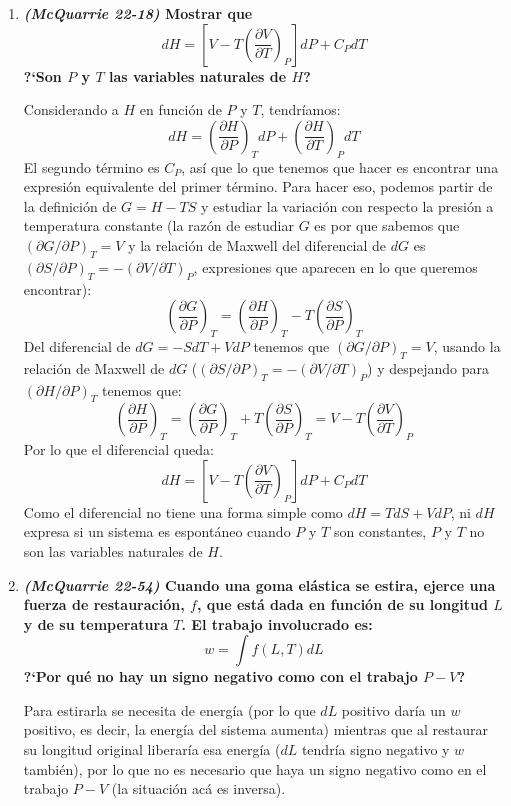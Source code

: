 \documentclass[a4paper,12pt]{article}
\begin{document}
\begin{enumerate}
\begin{enumerate}
Y:
$$q=-w=-(-0.63\;\mbox{kJ})=0.63\;\mbox{kJ}$$
Mientras que las funciones de estado ($\Delta U$, $\Delta H$, $\Delta S$ y $\Delta G$) tienen el mismo valor que el inciso anterior.

 \end{enumerate} %

 \item \textbf{\textit{(McQuarrie 22-18)} Mostrar que
$$dH=\left[V-T\left(\frac{\partial V}{\partial T}\right)_P\right]dP+C_PdT$$ 
?`Son $P$ y $T$ las variables naturales de $H$?} %

Considerando a $H$ en funci\'on de $P$ y $T$, tendr\'iamos:
$$dH=\left(\frac{\partial H}{\partial P}\right)_TdP+\left(\frac{\partial H}{\partial T}\right)_PdT$$
El segundo t\'ermino es $C_P$, as\'i que lo que tenemos que hacer es encontrar una expresi\'on equivalente del primer t\'ermino. Para hacer eso, podemos partir de la definici\'on de $G=H-TS$ y estudiar la variaci\'on con respecto la presi\'on a temperatura constante (la raz\'on de estudiar $G$ es por que sabemos que $(\partial G/\partial P)_T=V$ y la relaci\'on de Maxwell del diferencial de $dG$ es $(\partial S/\partial P)_T=-(\partial V/\partial T)_P$, expresiones que aparecen en lo que queremos encontrar):
$$\left(\frac{\partial G}{\partial P}\right)_T=\left(\frac{\partial H}{\partial P}\right)_T-T\left(\frac{\partial S}{\partial P}\right)_T$$
Del diferencial de $dG=-SdT+VdP$ tenemos que $(\partial G/\partial P)_T=V$, usando la relaci\'on de Maxwell de $dG$ ($(\partial S/\partial P)_T=-(\partial V/\partial T)_P$) y despejando para $(\partial H/\partial P)_T$ tenemos que:
$$\left(\frac{\partial H}{\partial P}\right)_T=\left(\frac{\partial G}{\partial P}\right)_T+T\left(\frac{\partial S}{\partial P}\right)_T=V-T\left(\frac{\partial V}{\partial T}\right)_P$$
Por lo que el diferencial queda:
$$dH=\left[V-T\left(\frac{\partial V}{\partial T}\right)_P\right]dP+C_PdT$$
Como el diferencial no tiene una forma simple como $dH=TdS+VdP$, ni $dH$ expresa si un sistema es espont\'aneo cuando $P$ y $T$ son constantes, $P$ y $T$ no son las variables naturales de $H$.

 \item \textbf{\textit{(McQuarrie 22-54)} Cuando una goma el\'astica se estira, ejerce una fuerza de restauraci\'on, $f$, que est\'a dada en funci\'on de su longitud $L$ y de su temperatura $T$. El trabajo involucrado es:
$$w=\int f(L,T)dL$$
?`Por qu\'e no hay un signo negativo como con el trabajo $P-V$?}

Para estirarla se necesita de energ\'ia (por lo que $dL$ positivo dar\'ia un $w$ positivo, es decir, la energ\'ia del sistema aumenta) mientras que al restaurar su longitud original liberar\'ia esa energ\'ia ($dL$ tendr\'ia signo negativo y $w$ tambi\'en), por lo que no es necesario que haya un signo negativo como en el trabajo $P-V$ (la situaci\'on ac\'a es inversa).


\end{enumerate}
\end{document}
